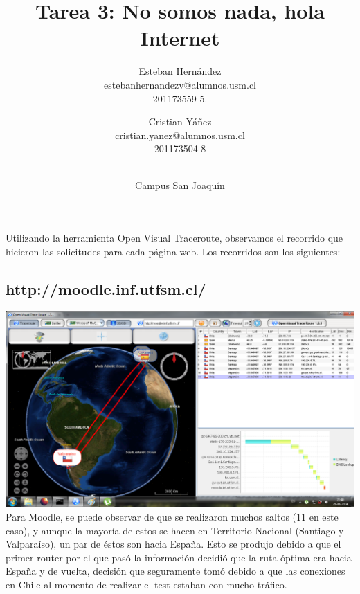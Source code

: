 \documentclass{article}
\title{Tarea 3: No somos nada, hola Internet}
\author{Esteban Hernández\\estebanhernandezv@alumnos.usm.cl\\201173559-5.\and Cristian Yáñez\\cristian.yanez@alumnos.usm.cl\\201173504-8 \and \\Campus San Joaquín }
\begin{document}
\begin{titlepage}
\maketitle
\end{titlepage}

\section{} 
Utilizando la herramienta Open Visual Traceroute, observamos el recorrido que hicieron las solicitudes para cada página web. Los recorridos son los siguientes:

\subsection{http://moodle.inf.utfsm.cl/}
\includegraphics[scale=0.52]{Img/moodle.png} 
Para Moodle, se puede observar de que se realizaron muchos saltos (11 en este caso), y aunque la mayoría de estos se hacen en Territorio Nacional (Santiago y Valparaíso), un par de éstos son hacia España. Esto se produjo debido a que el primer router por el que pasó la información decidió que la ruta óptima era hacia España y de vuelta, decisión que seguramente tomó debido a que las conexiones en Chile al momento de realizar el test estaban con mucho tráfico.
\end{document}
